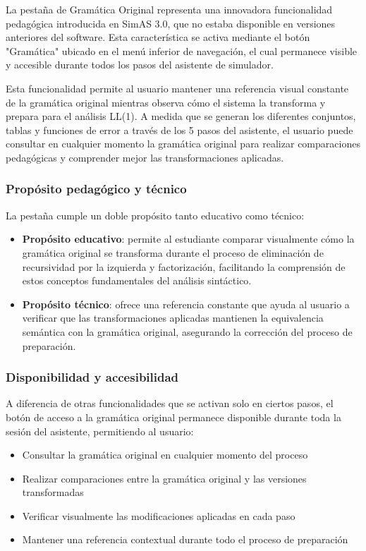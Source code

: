 La pestaña de Gramática Original representa una innovadora funcionalidad pedagógica introducida en SimAS 3.0, que no estaba disponible en versiones anteriores del software. Esta característica se activa mediante el botón \string"Gramática\string" ubicado en el menú inferior de navegación, el cual permanece visible y accesible durante todos los pasos del asistente de simulador.

Esta funcionalidad permite al usuario mantener una referencia visual constante de la gramática original mientras observa cómo el sistema la transforma y prepara para el análisis LL(1). A medida que se generan los diferentes conjuntos, tablas y funciones de error a través de los 5 pasos del asistente, el usuario puede consultar en cualquier momento la gramática original para realizar comparaciones pedagógicas y comprender mejor las transformaciones aplicadas.

\subsubsection{Propósito pedagógico y técnico}

La pestaña cumple un doble propósito tanto educativo como técnico:

\begin{itemize}
 \item \textbf{Propósito educativo}: permite al estudiante comparar visualmente cómo la gramática original se transforma durante el proceso de eliminación de recursividad por la izquierda y factorización, facilitando la comprensión de estos conceptos fundamentales del análisis sintáctico.

 \item \textbf{Propósito técnico}: ofrece una referencia constante que ayuda al usuario a verificar que las transformaciones aplicadas mantienen la equivalencia semántica con la gramática original, asegurando la corrección del proceso de preparación.
\end{itemize}

\subsubsection{Disponibilidad y accesibilidad}

A diferencia de otras funcionalidades que se activan solo en ciertos pasos, el botón de acceso a la gramática original permanece disponible durante toda la sesión del asistente, permitiendo al usuario:

\begin{itemize}
 \item Consultar la gramática original en cualquier momento del proceso
 \item Realizar comparaciones entre la gramática original y las versiones transformadas
 \item Verificar visualmente las modificaciones aplicadas en cada paso
 \item Mantener una referencia contextual durante todo el proceso de preparación
\end{itemize}

